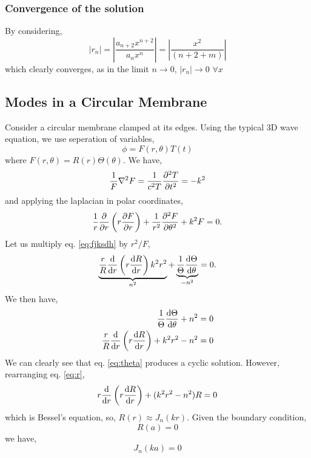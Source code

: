 \documentclass{book}
\begin{document}
\subsubsection{Convergence of the solution}
By considering,
\begin{equation}
	\left|r_n\right| = \left|\frac{a_{n+2}x^{n+2}}{a_nx^n}\right| = \left|\frac{x^2}{(n+2 +m)}\right|
\end{equation}
which clearly converges, as in the limit $n \to 0$, $\left|r_n\right| \to 0$ $\forall x$
\subsection{Modes in a Circular Membrane}
Consider a circular membrane clamped at its edges. Using the typical 3D wave equation, we use seperation of variables,
\begin{equation}
	\phi = F(r,\theta)T(t)
\end{equation}
where $F(r,\theta) = R(r)\Theta(\theta)$. We have,
\begin{equation}
	\frac{1}{F}\laplacian{F} = \frac{1}{c^2T}\pdv[2]{T}{t} = - k^2
\end{equation}
and applying the laplacian in polar coordinates,
\begin{equation}
	\frac{1}{r}\pdv{r}\left(r\pdv{F}{r}\right) + \frac{1}{r^2} \pdv[2]{F}{\theta} + k^2F = 0. \label{eq:fjksdh}
\end{equation}
Let us multiply eq. \eqref{eq:fjksdh} by $r^2/F$,
\begin{equation}
	\underbrace{\frac{r}{R}\dv{r}\left(r\dv{R}{r}\right) k^2r^2}_{n^2}  + \underbrace{\frac{1}{\Theta}\dv{\Theta}{\theta}}_{-n^2} = 0.
\end{equation}
We then have,
\begin{align}
	\frac{1}{\Theta}\dv{\Theta}{\theta} + n^2 = 0 \label{eq:theta}\\
	\frac{r}{R}\dv{r}\left(r\dv{R}{r}\right) + k^2r^2 - n^2 = 0 \label{eq:r}
\end{align}
We can clearly see that eq. \eqref{eq:theta} produces a cyclic solution. However, rearranging eq. \eqref{eq:r},
\begin{equation}
	r\dv{r}\left(r\dv{R}{r}\right) + (k^2r^2 - n^2)R = 0
\end{equation}
which is Bessel's equation, so, $R(r) \approx J_n(kr)$. Given the boundary condition,
\begin{equation}
	R(a) = 0
\end{equation}
we have,
\begin{equation}
	J_n(ka) = 0
\end{equation}
\end{document}
